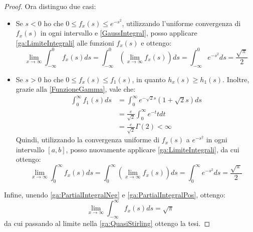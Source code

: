 \begin{proof}
	Ora distinguo due casi:
	\begin{itemize}
		\item	Se $s<0$ ho che $0\le f_x(s) \le e^{-s^2}$, utilizzando l'uniforme convergenza di $f_x(s)$ in ogni
				intervallo e \cref{GaussIntegral}, posso applicare \cref{ga:LimiteIntegrali} alle funzioni $f_x(s)$ 
				e ottengo:
				\begin{equation}\label{ga:PartialIntegralNeg}
					\lim_{x\to\infty} \int_{-\infty}^0{f_x(s)ds}=\int_{-\infty}^0{\left(\lim_{x\to\infty}f_x(s)\right)ds}
					=\int_{-\infty}^0{e^{-s^2}ds}=\frac{\sqrt{\pi}}{2}
				\end{equation}
		\item	Se $s>0$ ho che $0\le f_x(s) \le f_1(s)$, in quanto $h_x(s)\ge h_1(s)$. Inoltre, grazie
				alla \cref{FunzioneGamma}, vale che:
				\begin{equation*}
				\begin{split}
					\int_0^{\infty}{f_1(s)ds}	&=\int_0^\infty{e^{-\sqrt{2}s}\left(1+\sqrt{2}s \right)ds}\\
												&=\frac{e}{\sqrt{2}}\int_0^\infty{e^{-t}t dt}\\
												&=\frac{e}{\sqrt{2}}\Gamma(2)<\infty
				\end{split}
				\end{equation*}
				Quindi, utilizzando la convergenza uniforme di $f_x(s)$ a $e^{-s^2}$ in ogni intervallo
				$[a,b]$, posso nuovamente applicare \cref{ga:LimiteIntegrali}, da cui ottengo:
				\begin{equation}\label{ga:PartialIntegralPos}
					\lim_{x\to\infty} \int_0^\infty{f_x(s)ds}=\int_0^\infty{\left(\lim_{x\to\infty}f_x(s)\right)ds}
					=\int_0^\infty{e^{-s^2}ds}=\frac{\sqrt{\pi}}{2}
				\end{equation}
	\end{itemize}
	
	Infine, unendo \cref{ga:PartialIntegralNeg} e \cref{ga:PartialIntegralPos}, ottengo:
	\begin{equation*}
		\lim_{x\to\infty}\int_{-\infty}^\infty{ f_x(s) ds}=\sqrt{\pi}
	\end{equation*}
	da cui passando al limite nella \cref{ga:QuasiStirling} ottengo la tesi.
\end{proof}

